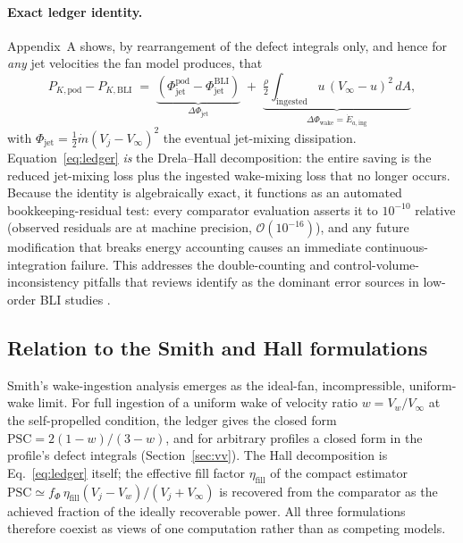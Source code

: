 \documentclass[10pt]{article}
\begin{document}
\paragraph{Exact ledger identity.} Appendix~A shows, by rearrangement of
the defect integrals only, and hence for \emph{any} jet velocities the fan
model produces, that
%
\begin{equation}
  P_{K,\mathrm{pod}} - P_{K,\mathrm{BLI}}
  \;=\;
  \underbrace{\left(\Phi_{\mathrm{jet}}^{\mathrm{pod}}
    - \Phi_{\mathrm{jet}}^{\mathrm{BLI}}\right)}_{\Delta\Phi_{\mathrm{jet}}}
  \;+\;
  \underbrace{\tfrac{\rho}{2}\!\int_{\mathrm{ingested}}\!
    u\,(V_\infty-u)^2\,dA}_{\Delta\Phi_{\mathrm{wake}} = \dot E_{a,\mathrm{ing}}},
  \label{eq:ledger}
\end{equation}
%
with $\Phi_{\mathrm{jet}}=\tfrac12\dot m (V_j-V_\infty)^2$ the eventual
jet-mixing dissipation. Equation~\eqref{eq:ledger} \emph{is} the
Drela--Hall decomposition: the entire saving is the reduced jet-mixing loss
plus the ingested wake-mixing loss that no longer occurs. Because the
identity is algebraically exact, it functions as an automated
bookkeeping-residual test: every comparator evaluation asserts it to
$10^{-10}$ relative (observed residuals are at machine precision,
$\mathcal{O}(10^{-16})$), and any future modification that breaks energy
accounting causes an immediate continuous-integration failure. This addresses
the double-counting and control-volume-inconsistency pitfalls that reviews
identify as the dominant error sources in low-order BLI studies
\citep{moirou2023}.

\subsection{Relation to the Smith and Hall formulations}\label{sec:unification}

Smith's wake-ingestion analysis \citep{smith1993} emerges as the ideal-fan,
incompressible, uniform-wake limit. For full ingestion of a uniform wake of
velocity ratio $w=V_w/V_\infty$ at the self-propelled condition, the ledger
gives the closed form $\mathrm{PSC} = 2(1-w)/(3-w)$, and for arbitrary
profiles a closed form in the profile's defect integrals
(Section~\ref{sec:vv}). The Hall decomposition is Eq.~\eqref{eq:ledger}
itself; the effective fill factor $\eta_{\mathrm{fill}}$ of the compact
estimator $\mathrm{PSC}\simeq f_\Phi\,\eta_{\mathrm{fill}}
(V_j-V_w)/(V_j+V_\infty)$ is recovered from the comparator as the achieved
fraction of the ideally recoverable power. All three formulations therefore
coexist as views of one computation rather than as competing models.
\end{document}
